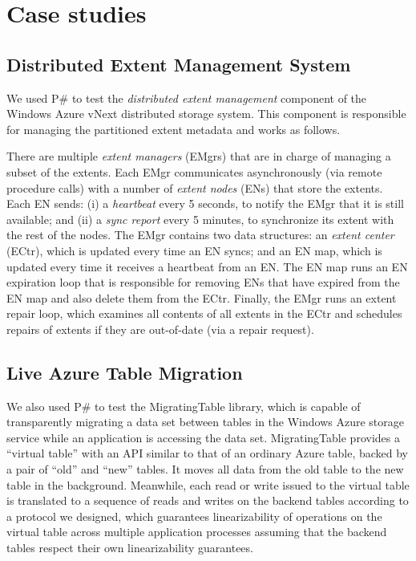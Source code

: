\documentclass{sig-alternate}
\newcommand{\psharp}{P\#\xspace}
\begin{document}
\section{Case studies}
\label{sec:cases}

\subsection{Distributed Extent Management System}
\label{sec:cases:azurestore}

We used \psharp to test the \emph{distributed extent management} component of the Windows Azure vNext distributed storage system. This component is responsible for managing the partitioned extent metadata and works as follows.

There are multiple \emph{extent managers} (EMgrs) that are in charge of managing a subset of the extents. Each EMgr communicates asynchronously (via remote procedure calls) with a number of \emph{extent nodes} (ENs) that store the extents. Each EN sends: (i) a \emph{heartbeat} every 5 seconds, to notify the EMgr that it is still available; and (ii) a \emph{sync report} every 5 minutes, to synchronize its extent with the rest of the nodes. The EMgr contains two data structures: an \emph{extent center} (ECtr), which is updated every time an EN syncs; and an EN map, which is updated every time it receives a heartbeat from an EN. The EN map runs an EN expiration loop that is responsible for removing ENs that have expired from the EN map and also delete them from the ECtr. Finally, the EMgr runs an extent repair loop, which examines all contents of all extents in the ECtr and schedules repairs of extents if they are out-of-date (via a repair request).

\subsection{Live Azure Table Migration}

We also used \psharp to test the MigratingTable library, which is capable of transparently migrating a data set between tables in the Windows Azure storage service while an application is accessing the data set.  MigratingTable provides a ``virtual table'' with an API similar to that of an ordinary Azure table, backed by a pair of ``old'' and ``new''  tables.  It moves all data from the old table to the new table in the background.  Meanwhile, each read or write issued to the virtual table is translated to a sequence of reads and writes on the backend tables according to a protocol we designed, which guarantees linearizability of operations on the virtual table across multiple application processes assuming that the backend tables respect their own linearizability guarantees.
\end{document}

